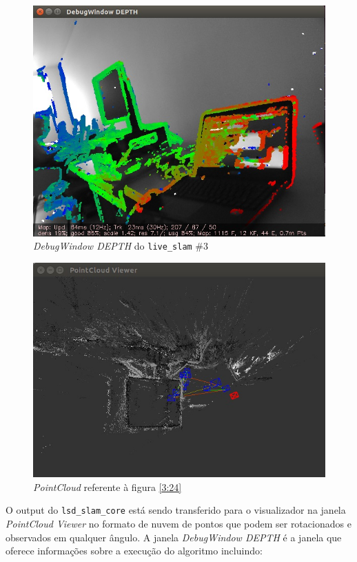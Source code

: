 \begin{figure}[!htb]
	\centering
		\includegraphics[width= \textwidth]{Imagens/figura3-24.jpg}
	\caption{\textit{DebugWindow DEPTH} do \texttt{live\_slam} \#3}
	\label{fig3:24}
\end{figure}

\begin{figure}[!htb]
	\centering
		\includegraphics[width= \textwidth]{Imagens/figura3-25.jpg}
	\caption{\textit{PointCloud} referente à figura \ref{3:24}}
	\label{fig3:25}
\end{figure}

O output do \texttt{lsd\_slam\_core} está sendo transferido para o visualizador na janela \textit{PointCloud Viewer} no formato de nuvem de pontos que podem ser rotacionados e observados em qualquer ângulo. A janela \textit{DebugWindow DEPTH} é a janela que oferece informações sobre a execução do algoritmo incluindo:


